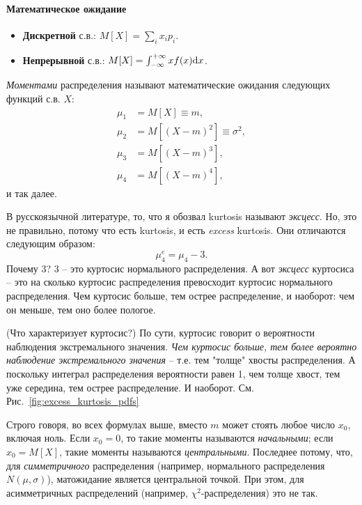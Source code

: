 \documentclass{report}
\begin{document}
\paragraph{Математическое ожидание}
\begin{itemize}
	\item \textbf{Дискретной} с.в.: $M[X] = \sum_i x_i p_i$.
	\item \textbf{Непрерывной} с.в.: $M[X] = \int_{-\infty}^{+\infty} xf(x)\mathrm d x$.
\end{itemize}
\emph{Моментами} распределения называют математические ожидания следующих функций с.в. $X$:
\begin{align}
	\mu_1 &= M\left[X\right] \equiv m, \tag{матожидание}\\
	\mu_2 &= M\left[(X-m)^2\right] \equiv \sigma^2, \tag{дисперсия}\\
	\mu_3 &= M\left[(X-m)^3\right], \tag{асимметрия}\\
	\mu_4 &= M\left[(X-m)^4\right], \tag{kurtosis}
\end{align}
и так далее.

\begin{rmk}[Терминология]
	В русскоязычной литературе, то, что я обозвал kurtosis называют \emph{эксцесс}.
	Но, это не правильно, потому что есть kurtosis, и есть \emph{excess} kurtosis.
	Они отличаются следующим образом:
	\[
	\mu_4^e = \mu_4 - 3.
	\]
	Почему 3? 3 -- это куртосис нормального распределения. А вот \emph{эксцесс} куртосиса -- это на сколько
	куртосис распределения превосходит куртосис нормального распределения. Чем куртосис больше, тем острее распределение, и наоборот: чем он меньше, тем оно более пологое.
\end{rmk}

\begin{rmk}(Что характеризует куртосис?)
	По сути, куртосис говорит о вероятности наблюдения экстремального значения. \emph{Чем куртосис больше, тем более вероятно наблюдение экстремального значения} -- т.е. тем "толще" хвосты распределения. А поскольку интеграл распределения вероятности равен 1, чем толще хвост, тем уже середина, тем острее распределение. И наоборот. См. Рис.~\ref{fig:excess_kurtosis_pdfs}
\end{rmk}

\begin{rmk}
	Строго говоря, во всех формулах выше, вместо $m$ может стоять любое число $x_0$, включая ноль.
	Если $x_0=0$, то такие моменты называются \emph{начальными}; если $x_0 = M\left[ X\right]$, такие моменты называются \emph{центральными}. Последнее потому, что, для \emph{симметричного} распределения (например, нормального распределения $N(\mu, \sigma)$), матожидание является
	центральной точкой. При этом, для асимметричных распределений (например, $\chi^2$-распределения) это не так.
\end{rmk}
\end{document}
